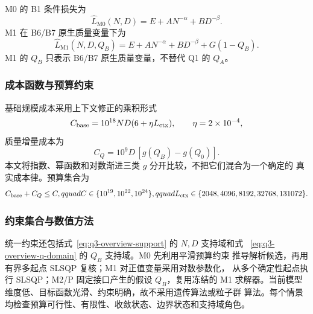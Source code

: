 M0 的 B1 条件损失为
\begin{equation}
 \widehat L_{\mathrm{M0}}(N,D)=E+A N^{-\alpha}+B D^{-\beta}.
 \label{eq:q3-overview-m0}
\end{equation}
M1 在 B6/B7 原生质量变量下为
\begin{equation}
 \widehat L_{\mathrm{M1}}(N,D,Q_B)
 =E+A N^{-\alpha}+B D^{-\beta}+G(1-Q_B).
 \label{eq:q3-overview-m1}
\end{equation}
M1 的 $Q_B$ 只表示 B6/B7 原生质量变量，不替代 Q1 的 $Q_A$。

\subsubsection{成本函数与预算约束}

基础规模成本采用上下文修正的乘积形式
\begin{equation}
 C_{\mathrm{base}}=10^{18}ND(6+\eta L_{\rm ctx}),
 \qquad \eta=2\times10^{-4},
 \label{eq:q3-overview-base-cost}
\end{equation}
质量增量成本为
\begin{equation}
 C_Q=10^9D\,[g(Q_B)-g(Q_0)].
 \label{eq:q3-overview-quality-cost}
\end{equation}
本文将指数、幂函数和对数渐进三类 $g$ 分开比较，不把它们混合为一个确定的
真实成本律。预算集合为
\begin{equation}
 C_{\mathrm{base}}+C_Q\le C,qquad
 C\in\{10^{19},10^{22},10^{24}\},qquad
 L_{\rm ctx}\in\{2048,4096,8192,32768,131072\}.
 \label{eq:q3-overview-constraints}
\end{equation}

\subsubsection{约束集合与数值方法}

统一约束还包括式~\eqref{eq:q3-overview-support} 的 $N,D$ 支持域和式
~\eqref{eq:q3-overview-q-domain} 的 $Q_B$ 支持域。M0 先利用平滑预算约束
推导解析候选，再用有界多起点 SLSQP 复核；M1 对正值变量采用对数参数化，
从多个确定性起点执行 SLSQP；M2/P 固定接口产生的假设 $Q_B$，复用冻结的 M1
求解器。当前模型维度低、目标函数光滑、约束明确，故不采用遗传算法或粒子群
算法。每个情景均检查预算可行性、有限性、收敛状态、边界状态和支持域角色。

